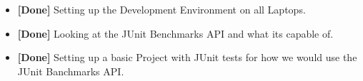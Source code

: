 \begin{itemize}
    \item \textbf{[Done]} Setting up the Development Environment on all Laptops.
    \item \textbf{[Done]} Looking at the JUnit Benchmarks API and what its capable of.
    \item \textbf{[Done]} Setting up a basic Project with JUnit tests for how we would use the JUnit Banchmarks API.
\end{itemize}